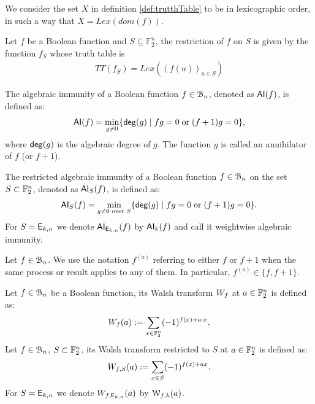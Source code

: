 \documentclass[11pt]{llncs}
\begin{document}
\begin{remark}
    We consider the set $X$ in definition \ref{def:trutthTable} to be in lexicographic order, in such a way that $X = Lex\left(dom(f)\right)$.
\end{remark}


\begin{definition}[Restriction of $f$ on $S$]
	Let $f$ be a Boolean function and $S\subseteq \mathbb{F}_2^n$, the restriction of $f$ on $S$ is given by the function $f_S$ whose truth table is
	\begin{align*}
	TT(f_S) = Lex\left(\left(f(u)\right)_{u\in S}\right)
	\end{align*}
\end{definition}


\begin{definition} \label{def:ai}
	The algebraic immunity of a Boolean function $f\in \mathcal{B}_{n}$, denoted as $\mathsf{AI}(f)$, is defined as:
	\[ \mathsf{AI}(f) = \min_{g \neq 0}\{ \mathsf{deg}(g) \; | \; fg = 0 \; \text{or} \; (f + 1)g = 0 \}{,} \]
	where $\mathsf{deg}(g)$ is the algebraic degree of $g$.
	The function $g$ is called an annihilator of $f$ (or $f + 1$). 
	
The restricted algebraic immunity of a Boolean function $f\in \mathcal{B}_{n}$ on the set $S\subset \mathbb{F}_2^n$, denoted as $\mathsf{AI}_S(f)$, is defined as:
\[ \mathsf{AI}_S(f) = \min_{g \neq 0 \text{ over } S}\{ \mathsf{deg}(g) \; | \; fg = 0 \; \text{or} \; (f + 1)g = 0 \}{.} \]	
For $S=\mathsf{E}_{k,n}$ we denote $\mathsf{AI}_{\mathsf{E}_{k,n}}(f)$ by $\mathsf{AI}_{k}(f)$ and call it weightwise algebraic immunity.
	
	
\end{definition}

\begin{remark}
    Let $f\in \mathcal{B}_{n}$. We use the notation $f^{(o)}$ referring to either $f$ or $f + 1$ when the same process or result applies to any of them. 
    In particular, $f^{(o)} \in \{f, f + 1\}$.
\end{remark}


\iffalse
\begin{definition}\label{def:walsh_transform}
	Let $f\in \mathcal{B}_{n}$ be a Boolean function, its Walsh transform $W_{f}$ at $a \in \mathbb{F}_2^n$ is defined as:
	\[  W_{f} (a) := \sum_{x \in \mathbb{F}_2^n} (-1)^{f(x) +  a \cdot x }.\]
	Let $f\in \mathcal{B}_{n}$, $S \subset \mathbb{F}_2^n$, its Walsh transform restricted to $S$ at $a \in \mathbb{F}_2^n$ is defined as:
	\[  W_{f,S} (a) := \sum_{x\in S} (-1)^{f(x)+ax}.\]
	For $S=\mathsf{E}_{k,n}$ we denote $W_{f,\mathsf{E}_{k,n}} (a)$ by $\mathcal{W}_{f,k}(a)$.%
	
\end{definition}
\end{document}
